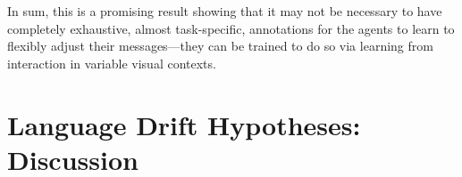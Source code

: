 In sum, this is a promising result showing that it may not be necessary to have completely exhaustive, almost task-specific, annotations for the agents to learn to flexibly adjust their messages---they can be trained to do so via learning from interaction in variable visual contexts. 



\section{Language Drift Hypotheses: Discussion}

